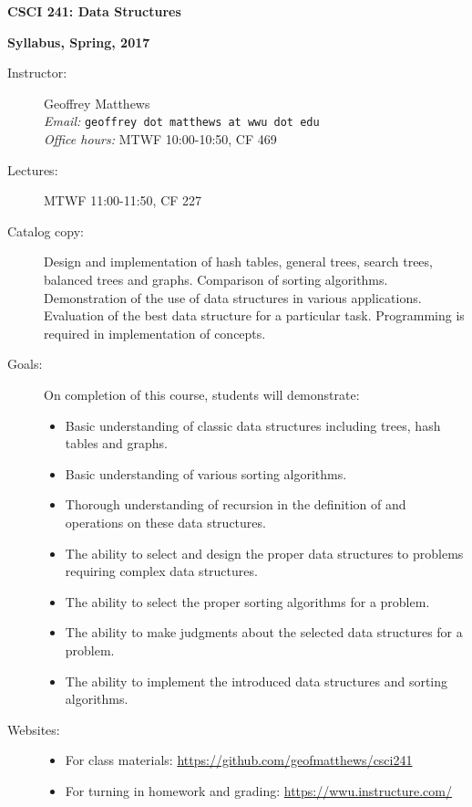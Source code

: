 \documentclass{article}
\begin{document}
\centerline{\Large\bf CSCI 241: Data Structures}
\centerline{\large\bf Syllabus, Spring, 2017}


\begin{description}


\item[Instructor:] Geoffrey Matthews\\
{\em Email:} {\tt geoffrey dot matthews at wwu dot edu}\\
{\em Office hours:} MTWF 10:00-10:50, CF 469


\item[Lectures:] MTWF 11:00-11:50, CF 227


\item[Catalog copy:] Design and implementation of hash tables, general
  trees, search trees, balanced trees and graphs. Comparison of
  sorting algorithms. Demonstration of the use of data structures in
  various applications. Evaluation of the best data structure for a
  particular task. Programming is required in implementation of
  concepts.

\item[Goals:]  On completion of this course, students will demonstrate:
\begin{itemize}
\item
  Basic understanding of classic data structures including trees, hash
  tables and graphs. 
\item Basic understanding of various sorting algorithms.
\item Thorough understanding of recursion in the definition of and
  operations on these data structures. 
\item The ability to select and design the proper data structures to
  problems requiring complex data structures. 
\item The ability to select the proper sorting algorithms for a
  problem. 
\item The ability to make judgments about the selected data structures
  for a problem. 
\item The ability to implement the introduced data structures and
  sorting algorithms. 

\end{itemize}

\item[Websites:]\mbox{}
\begin{itemize}
  \item For class materials:
    \url{https://github.com/geofmatthews/csci241} 
  \item For turning in homework and grading:
    \url{https://wwu.instructure.com/}  
\end{itemize}


\end{description}
\end{document}
